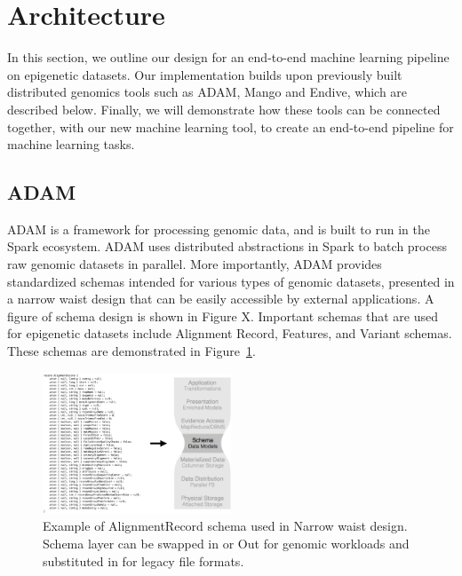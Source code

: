 \documentclass{sig-alternate-05-2015}
\begin{document}
\section{Architecture}
In this section, we outline our design for an end-to-end machine learning pipeline on epigenetic datasets. Our implementation builds upon previously built distributed genomics tools such as ADAM, Mango and Endive, which are described below. Finally, we will demonstrate how these tools can be connected together, with our new machine learning tool, to create an end-to-end pipeline for machine learning tasks. \\

\subsection{ADAM}
ADAM is a framework for processing genomic data, and is built to run in the Spark ecosystem. ADAM uses distributed abstractions in Spark to batch process raw genomic datasets in parallel. More importantly, ADAM provides standardized schemas intended for various types of genomic datasets, presented in a narrow waist design that can be easily accessible by external applications. A figure of schema design is shown in Figure X. Important schemas that are used for epigenetic datasets include Alignment Record, Features, and Variant schemas. These schemas are demonstrated in Figure~\ref{fig:adam}. \\

 \begin{figure}
   \label{fig:adam}
   \includegraphics[width=0.5\textwidth]{figures/adamSchema.png}
   \caption{Example of AlignmentRecord schema used in
   Narrow waist design. Schema layer can be swapped in or
   Out for genomic workloads and substituted in for legacy file formats.}
 \end{figure}
\end{document}

